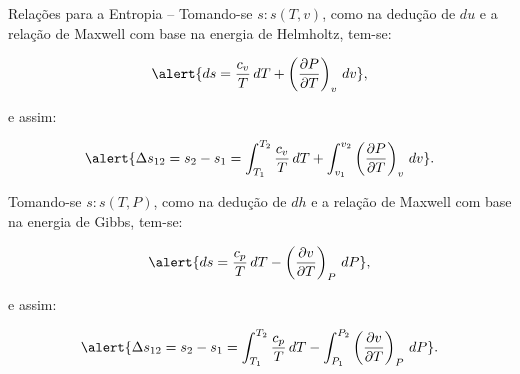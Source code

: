     \begin{frame}[allowframebreaks]{Relações para a Entropia --}\vspace*{-0em}
        Tomando-se \alert{$s\!:\!s(T, v)$}, como na dedução de \alert{$du$} e a relação de
        Maxwell com base na energia de \alert{Helmholtz}, tem-se: 

        \begin{equation*}
            \alert{
                ds = 
                    \frac{c_v}{T}\,dT +
                    \left(
                        \frac{\partial P}{\partial T}
                    \right)_v\,dv
            },
        \end{equation*}

        \noindent e assim:

        \begin{equation*}
            \alert{
                \Delta s_{12} = s_2 - s_1 =
                    \int_{T_1}^{T_2}
                        \frac{c_v}{T}\,dT +
                    \int_{v_1}^{v_2}
                        \left(
                            \frac{\partial P}{\partial T}
                        \right)_v\,dv
            }.
        \end{equation*}

        \pagebreak
        Tomando-se \alert{$s\!:\!s(T, P)$}, como na dedução de \alert{$dh$} e a relação de
        Maxwell com base na energia de \alert{Gibbs}, tem-se: 

        \begin{equation*}
            \alert{
                ds = 
                    \frac{c_p}{T}\,dT -
                    \left(
                        \frac{\partial v}{\partial T}
                    \right)_P\,dP
            },
        \end{equation*}

        \noindent e assim:

        \begin{equation*}
            \alert{
                \Delta s_{12} = s_2 - s_1 =
                    \int_{T_1}^{T_2}
                        \frac{c_p}{T}\,dT -
                    \int_{P_1}^{P_2}
                        \left(
                            \frac{\partial v}{\partial T}
                        \right)_P\,dP
            }.
        \end{equation*}

    \end{frame}

